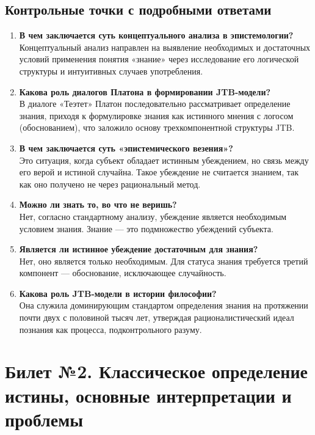 \documentclass[a4paper,12pt]{article}
\begin{document}
\subsection{Контрольные точки с подробными ответами}

\begin{enumerate}
\item \textbf{В чем заключается суть концептуального анализа в эпистемологии?}\\
Концептуальный анализ направлен на выявление необходимых и достаточных условий применения понятия «знание» через исследование его логической структуры и интуитивных случаев употребления.

\item \textbf{Какова роль диалогов Платона в формировании JTB-модели?}\\
В диалоге «Теэтет» Платон последовательно рассматривает определение знания, приходя к формулировке знания как истинного мнения с логосом (обоснованием), что заложило основу трехкомпонентной структуры JTB.

\item \textbf{В чем заключается суть «эпистемического везения»?}\\
Это ситуация, когда субъект обладает истинным убеждением, но связь между его верой и истиной случайна. Такое убеждение не считается знанием, так как оно получено не через рациональный метод.

\item \textbf{Можно ли знать то, во что не веришь?}\\
Нет, согласно стандартному анализу, убеждение является необходимым условием знания. Знание — это подмножество убеждений субъекта.

\item \textbf{Является ли истинное убеждение достаточным для знания?}\\
Нет, оно является только необходимым. Для статуса знания требуется третий компонент — обоснование, исключающее случайность.

\item \textbf{Какова роль JTB-модели в истории философии?}\\
Она служила доминирующим стандартом определения знания на протяжении почти двух с половиной тысяч лет, утверждая рационалистический идеал познания как процесса, подконтрольного разуму.
\end{enumerate}

\newpage
\section{Билет №2. Классическое определение истины, основные интерпретации и проблемы}
\end{document}
